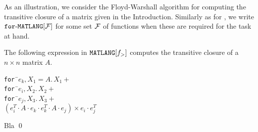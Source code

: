 
As an illustration, we consider the Floyd-Warshall algorithm for computing the transitive closure of a matrix given in the Introduction. Similarly as for \lang, we write $\texttt{for}\text{-}\texttt{MATLANG}[\mathcal{F}]$ for some set $\mathcal{F}$ of functions when these are required for the task at hand.

\begin{example}\label{ex:floyd}
The following expression in $\texttt{MATLANG}[f_>]$ computes the transitive closure of a $n\times n$ matrix $A$.
\begin{tabbing}
\texttt{for }\=$e_k,X_1 = A.\, X_1 + $\\
\> \texttt{for }\=$e_i,X_2.\, X_2 +$ \\
\>\>\texttt{for }\=$e_j,X_3.\, X_3 +$ \\
\>\>\>$(e_i^T\cdot A\cdot e_k \cdot e_k^T\cdot A\cdot e_j)\times e_i\cdot e_j^T$
\end{tabbing}
Bla \qed
\end{example}


